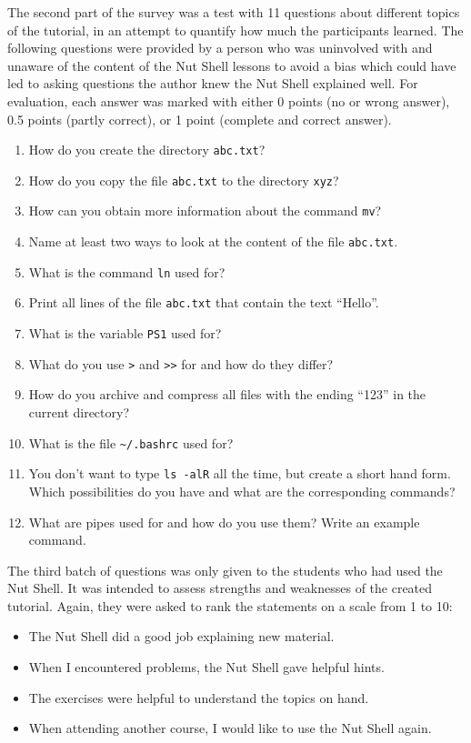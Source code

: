 \documentclass[paper=a4,twoside,abstract=on,cleardoublepage=empty,numbers=noenddot,toc=bib,12pt,appendixprefix=true]{scrreprt}
\begin{document}
The second part of the survey was a test with 11 questions about different topics of the tutorial, in an attempt to quantify how much the participants learned. The following questions were provided by a person who was uninvolved with and unaware of the content of the Nut Shell lessons to avoid a bias which could have led to asking questions the author knew the Nut Shell explained well. For evaluation, each answer was marked with either 0 points (no or wrong answer), 0.5 points (partly correct), or 1 point (complete and correct answer).

\begin{enumerate}
    \item How do you create the directory \texttt{abc.txt}?
    \item How do you copy the file \texttt{abc.txt} to the directory \texttt{xyz}?
    \item How can you obtain more information about the command \texttt{mv}?
    \item Name at least two ways to look at the content of the file \texttt{abc.txt}.
    \item What is the command \texttt{ln} used for?
    \item Print all lines of the file \texttt{abc.txt} that contain the text “Hello”.
    \item What is the variable \texttt{PS1} used for?
    \item What do you use \texttt{>} and \texttt{>>} for and how do they differ?
    \item How do you archive and compress all files with the ending “123” in the current directory?
    \item What is the file \texttt{\textasciitilde/.bashrc} used for?
    \item You don't want to type \texttt{ls -alR} all the time, but create a short hand form. Which possibilities do you have and what are the corresponding commands?
    \item What are pipes used for and how do you use them? Write an example command.
\end{enumerate}

The third batch of questions was only given to the students who had used the Nut Shell. It was intended to assess strengths and weaknesses of the created tutorial. Again, they were asked to rank the statements on a scale from 1 to 10:

\begin{itemize}
    \item The Nut Shell did a good job explaining new material.
    \item When I encountered problems, the Nut Shell gave helpful hints.
    \item The exercises were helpful to understand the topics on hand.
    \item When attending another course, I would like to use the Nut Shell again.
\end{itemize}
\end{document}
